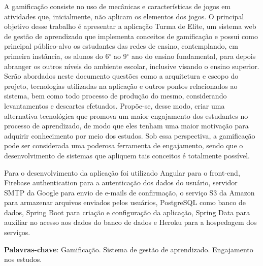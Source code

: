 \setlength{\absparsep}{18pt} %
\begin{resumo}

 \vspace{\onelineskip}

 A gamificação consiste no uso de mecânicas e características de jogos em atividades que, inicialmente, não aplicam os elementos dos jogos. O principal objetivo desse trabalho é apresentar a aplicação Turma de Elite, um sistema web de gestão de aprendizado que implementa conceitos de gamificação e possui como principal público-alvo os estudantes das redes de ensino, contemplando, em primeira instância, os alunos do 6$^\circ$ ao 9$^\circ$ ano do ensino fundamental, para depois abranger os outros níveis do ambiente escolar, inclusive visando o ensino superior. Serão abordados neste documento questões como a arquitetura e escopo do projeto, tecnologias utilizadas na aplicação e outros pontos relacionados ao sistema, bem como todo processo de produção do mesmo, considerando levantamentos e descartes efetuados. 
 Propõe-se, desse modo, criar uma alternativa tecnológica que promova um maior engajamento dos estudantes no processo de aprendizado, de modo que eles tenham uma maior motivação para adquirir conhecimento por meio dos estudos. Sob essa perspectiva, a gamificação pode ser considerada uma poderosa ferramenta de engajamento, sendo que o desenvolvimento de sistemas que apliquem tais conceitos é totalmente possível.
 
 Para o desenvolvimento da aplicação foi utilizado Angular para o front-end, Firebase authentication para a autenticação dos dados do usuário, servidor SMTP da Google para envio de e-mails de confirmação, o serviço S3 da Amazon para armazenar arquivos enviados pelos usuários, PostgreSQL como banco de dados, Spring Boot para criação e configuração da aplicação, Spring Data para auxiliar no acesso aos dados do banco de dados e Heroku para a hospedagem dos serviços.
 
 \vspace{\onelineskip}
 
 \textbf{Palavras-chave}: Gamificação. Sistema de gestão de aprendizado. Engajamento nos estudos.
 
\end{resumo}

